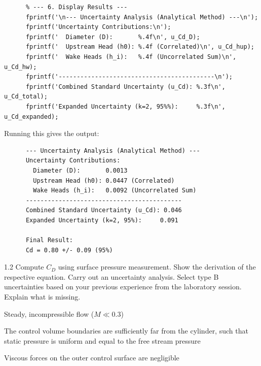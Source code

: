 \begin{derivation}
\begin{verbatim}
      % --- 6. Display Results ---
      fprintf('\n--- Uncertainty Analysis (Analytical Method) ---\n');
      fprintf('Uncertainty Contributions:\n');
      fprintf('  Diameter (D):       %.4f\n', u_Cd_D);
      fprintf('  Upstream Head (h0): %.4f (Correlated)\n', u_Cd_hup);
      fprintf('  Wake Heads (h_i):   %.4f (Uncorrelated Sum)\n', u_Cd_hw);
      fprintf('-------------------------------------------\n');
      fprintf('Combined Standard Uncertainty (u_Cd): %.3f\n', u_Cd_total);
      fprintf('Expanded Uncertainty (k=2, 95%%):     %.3f\n', u_Cd_expanded);
    \end{verbatim}
    Running this gives the output:
    \begin{verbatim}
      --- Uncertainty Analysis (Analytical Method) ---
      Uncertainty Contributions:
        Diameter (D):       0.0013
        Upstream Head (h0): 0.0447 (Correlated)
        Wake Heads (h_i):   0.0092 (Uncorrelated Sum)
      -------------------------------------------
      Combined Standard Uncertainty (u_Cd): 0.046
      Expanded Uncertainty (k=2, 95%):     0.091

      Final Result:
      Cd = 0.80 +/- 0.09 (95%)
    \end{verbatim}
  \end{derivation}


  \begin{problem}{1.2}
  Compute $C_D$ using surface pressure measurement. Show the derivation of the respective equation. Carry out an uncertainty analysis. Select type B uncertainties based on your previous experience from the laboratory session. Explain what is missing.
  \end{problem}

  \begin{assumptions}
    \item Steady, incompressible flow ($M \ll \num{0,3}$)
    \item The control volume boundaries are sufficiently far from the cylinder, such that static pressure is uniform and equal to the free stream pressure
    \item Viscous forces on the outer control surface are negligible
  \end{assumptions}


